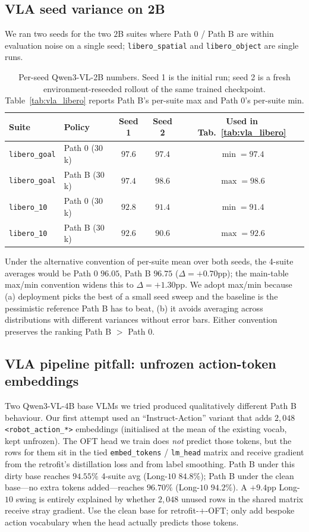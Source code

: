 \documentclass{article}
\begin{document}
\subsection{VLA seed variance on 2B}
\label{app:vla_variance}
We ran two seeds for the two $2$B suites where Path 0 / Path B are within evaluation noise on a single seed; \texttt{libero\_spatial} and \texttt{libero\_object} are single runs.
\begin{table}[h]
\caption{Per-seed Qwen3-VL-2B numbers. Seed 1 is the initial run; seed 2 is a fresh environment-reseeded rollout of the same trained checkpoint. Table~\ref{tab:vla_libero} reports Path B's per-suite max and Path 0's per-suite min.}
\label{tab:vla_seed_variance}
\centering\small
\begin{tabular}{llccc}
\toprule
Suite & Policy & Seed 1 & Seed 2 & Used in Tab.~\ref{tab:vla_libero} \\
\midrule
\texttt{libero\_goal} & Path 0 ($30$k) & $97.6$ & $97.4$ & $\min{=}97.4$ \\
\texttt{libero\_goal} & Path B ($30$k) & $97.4$ & $98.6$ & $\max{=}98.6$ \\
\texttt{libero\_10}   & Path 0 ($30$k) & $92.8$ & $91.4$ & $\min{=}91.4$ \\
\texttt{libero\_10}   & Path B ($30$k) & $92.6$ & $90.6$ & $\max{=}92.6$ \\
\bottomrule
\end{tabular}
\end{table}
Under the alternative convention of per-suite mean over both seeds, the 4-suite averages would be Path 0 $96.05$, Path B $96.75$ ($\Delta{=}+0.70$pp); the main-table max/min convention widens this to $\Delta{=}+1.30$pp. We adopt max/min because (a) deployment picks the best of a small seed sweep and the baseline is the pessimistic reference Path B has to beat, (b) it avoids averaging across distributions with different variances without error bars. Either convention preserves the ranking Path B $>$ Path 0.

\subsection{VLA pipeline pitfall: unfrozen action-token embeddings}
\label{app:vla_pitfall}
Two Qwen3-VL-4B base VLMs we tried produced qualitatively different Path B behaviour. Our first attempt used an ``Instruct-Action'' variant that adds $2{,}048$ \texttt{<robot\_action\_*>} embeddings (initialised at the mean of the existing vocab, kept unfrozen). The OFT head we train does \emph{not} predict those tokens, but the rows for them sit in the tied \texttt{embed\_tokens} / \texttt{lm\_head} matrix and receive gradient from the retrofit's distillation loss and from label smoothing. Path B under this dirty base reaches $94.55\%$ 4-suite avg (Long-$10$ $84.8\%$); Path B under the clean base---no extra tokens added---reaches $96.70\%$ (Long-$10$ $94.2\%$). A $+9.4$pp Long-$10$ swing is entirely explained by whether $2{,}048$ unused rows in the shared matrix receive stray gradient. Use the clean base for retrofit-$+$-OFT; only add bespoke action vocabulary when the head actually predicts those tokens.
\end{document}
